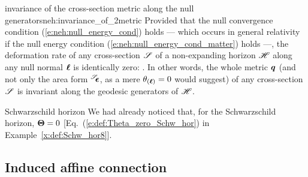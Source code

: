 \begin{tprop}{invariance of the cross-section metric along the null generators}{neh:invariance_of_2metric}
Provided that the null convergence condition (\ref{e:neh:null_energy_cond})
holds --- which occurs in general relativity if the
null energy condition
(\ref{e:neh:null_energy_cond_matter})
holds ---,
the deformation rate of any cross-section $\mathscr{S}$ of a non-expanding horizon $\mathscr{H}$
along any null normal $\bm{\ell}$ is identically zero:
\be \label{e:neh:Lie_el_q_zero}
    .
\ee
In other words,
the whole metric $\bm{q}$ (and not only the area form
${}^{\mathscr{S}}\!\!\bm{\epsilon}$, as a mere $\theta_{(\bm{\ell})}=0$ would suggest) of any cross-section
$\mathscr{S}$ is invariant along the geodesic generators of $\mathscr{H}$.
\end{tprop}

\begin{texample}{Schwarzschild horizon}{}
We had already noticed that, for the Schwarzschild horizon, $\bm{\Theta}=0$
[Eq.~(\ref{e:def:Theta_zero_Schw_hor}) in Example~\ref{x:def:Schw_hor8}].
\end{texample}

\subsection{Induced affine connection} \label{e:neh:induced_connection}

